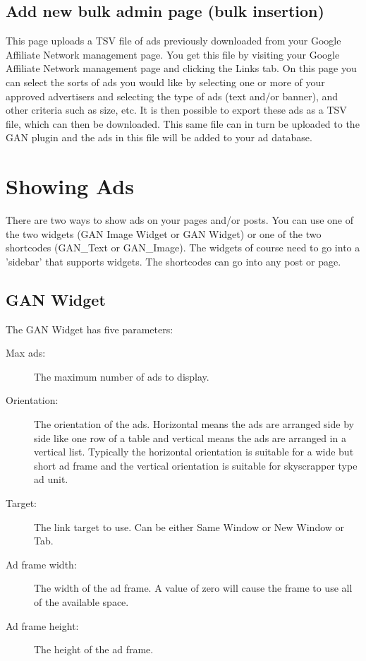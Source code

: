 \documentclass[letterpaper]{article}
\begin{document}
\subsection{Add new bulk admin page (bulk insertion)}

This page uploads a TSV file of ads previously downloaded from your
Google Affiliate Network management page. You get this file by visiting
your Google Affiliate Network management page and clicking the Links
tab. On this page you can select the sorts of ads you would like by
selecting one or more of your approved advertisers and selecting the
type of ads (text and/or banner), and other criteria such as size, etc.
It is then possible to export these ads as a TSV file, which can then
be downloaded. This same file can in turn be uploaded to the GAN plugin
and the ads in this file will be added to your ad database.

\section{Showing Ads}

There are two ways to show ads on your pages and/or posts.  You can
use one of the two widgets (GAN Image Widget or GAN Widget) or one of
the two shortcodes (GAN\_Text or GAN\_Image).  The widgets of course need
to go into a 'sidebar' that supports widgets.  The shortcodes can go
into any post or page.

\subsection{GAN Widget}

The GAN Widget has five parameters:
\begin{description}
  \item[Max ads:] The maximum number of ads to display.
  \item[Orientation:] The orientation of the ads. Horizontal
means the ads are arranged side by side like one row of a table and
vertical means the ads are arranged in a vertical list. Typically the
horizontal orientation is suitable for a wide but short ad frame and the
vertical orientation is suitable for skyscrapper type ad unit.
  \item[Target:] The link target to use. Can be either Same 
Window or New Window or Tab.
  \item[Ad frame width:] The width of the ad frame. A value
of zero will cause the frame to use all of the available space.
  \item[Ad frame height:] The height of the ad frame.
\end{description}
\end{document}
